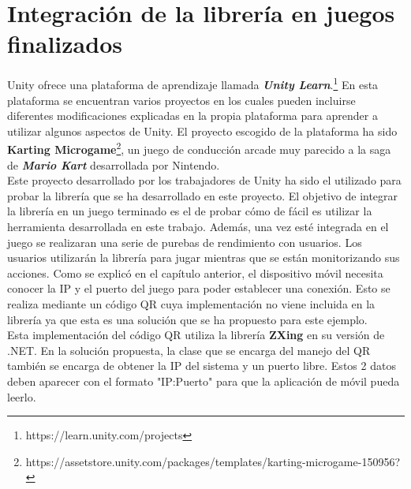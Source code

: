 \section{Integraci\'on de la librer\'ia en juegos finalizados}

Unity ofrece una plataforma de aprendizaje llamada \textbf{\textit{Unity Learn}}.\footnote{https://learn.unity.com/projects} En esta plataforma se encuentran varios proyectos en los cuales pueden incluirse diferentes modificaciones explicadas en la propia plataforma para aprender a utilizar algunos aspectos de Unity. El proyecto escogido de la plataforma ha sido \textbf{Karting Microgame}\footnote{https://assetstore.unity.com/packages/templates/karting-microgame-150956?}, un juego de conducci\'on arcade muy parecido a la saga de \textbf{\textit{Mario Kart}} desarrollada por Nintendo.\\

Este proyecto desarrollado por los trabajadores de Unity ha sido el utilizado para probar la librer\'ia que se ha desarrollado en este proyecto. El objetivo de integrar la librer\'ia en un juego terminado es el de probar c\'omo de f\'acil es utilizar la herramienta desarrollada en este trabajo. Adem\'as, una vez est\'e integrada en el juego se realizaran una serie de purebas de rendimiento con usuarios. Los usuarios utilizar\'an la librer\'ia para jugar mientras que se est\'an monitorizando sus acciones. Como se explic\'o en el cap\'itulo anterior, el dispositivo m\'ovil necesita conocer la IP y el puerto del juego para poder establecer una conexi\'on. Esto se realiza mediante un c\'odigo QR cuya implementaci\'on no viene incluida en la librer\'ia ya que esta es una soluci\'on que se ha propuesto para este ejemplo.\\

Esta implementaci\'on del c\'odigo QR utiliza la librer\'ia \textbf{ZXing} en su versi\'on de .NET. En la soluci\'on propuesta, la clase que se encarga del manejo del QR tambi\'en se encarga de obtener la IP del sistema y un puerto libre. Estos 2 datos deben aparecer con el formato "IP:Puerto" para que la aplicaci\'on de m\'ovil pueda leerlo. \\


